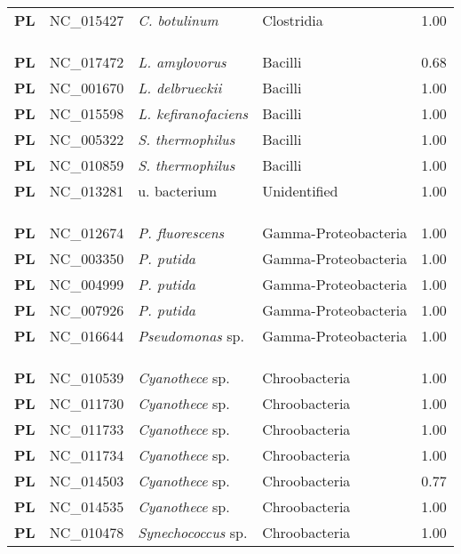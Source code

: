 \begin{adjustwidth}{-3cm}{2cm}
{\begin{supertabular}{>{\bfseries}l|p{0.1\textwidth}p{0.14\textwidth}l|l}
PL & NC\_015427 &  \textit{C. botulinum} & Clostridia & 1.00\\
\\
\\
\hline\\
PL & NC\_017472 &  \textit{L. amylovorus} & Bacilli & 0.68\\
PL & NC\_001670 &  \textit{L. delbrueckii} & Bacilli & 1.00\\
PL & NC\_015598 &  \textit{L. kefiranofaciens} & Bacilli & 1.00\\
PL & NC\_005322 &  \textit{S. thermophilus} & Bacilli & 1.00\\
PL & NC\_010859 &  \textit{S. thermophilus} & Bacilli & 1.00\\
PL & NC\_013281 & u. bacterium & Unidentified & 1.00\\
\\
\\
\hline\\
PL & NC\_012674 & \textit{P. fluorescens} & Gamma-Proteobacteria & 1.00\\
PL & NC\_003350 & \textit{P. putida} & Gamma-Proteobacteria & 1.00\\
PL & NC\_004999 & \textit{P. putida} & Gamma-Proteobacteria & 1.00\\
PL & NC\_007926 & \textit{P. putida} & Gamma-Proteobacteria & 1.00\\
PL & NC\_016644 & \textit{Pseudomonas} sp. & Gamma-Proteobacteria & 1.00\\
\\
\\
\hline\\
PL & NC\_010539 & \textit{Cyanothece} sp. & Chroobacteria & 1.00\\
PL & NC\_011730 & \textit{Cyanothece} sp. & Chroobacteria & 1.00\\
PL & NC\_011733 & \textit{Cyanothece} sp. & Chroobacteria & 1.00\\
PL & NC\_011734 & \textit{Cyanothece} sp. & Chroobacteria & 1.00\\
PL & NC\_014503 & \textit{Cyanothece} sp. & Chroobacteria & 0.77\\
PL & NC\_014535 & \textit{Cyanothece} sp. & Chroobacteria & 1.00\\
PL & NC\_010478 & \textit{Synechococcus} sp. & Chroobacteria & 1.00\\

\end{supertabular}}
\end{adjustwidth}
